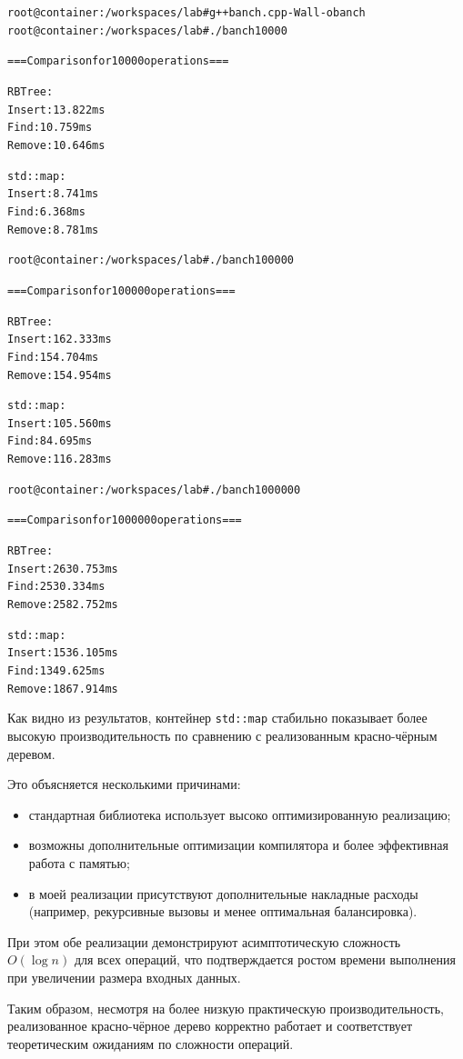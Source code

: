 \begin{alltt}
root@container:/workspaces/lab# g++ banch.cpp -Wall -o banch
root@container:/workspaces/lab# ./banch 10000

=== Comparison for 10000 operations ===

RBTree:
  Insert: 13.822 ms
  Find:   10.759 ms
  Remove: 10.646 ms

std::map:
  Insert: 8.741 ms
  Find:   6.368 ms
  Remove: 8.781 ms

root@container:/workspaces/lab# ./banch 100000

=== Comparison for 100000 operations ===

RBTree:
  Insert: 162.333 ms
  Find:   154.704 ms
  Remove: 154.954 ms

std::map:
  Insert: 105.560 ms
  Find:   84.695 ms
  Remove: 116.283 ms

root@container:/workspaces/lab# ./banch 1000000

=== Comparison for 1000000 operations ===

RBTree:
  Insert: 2630.753 ms
  Find:   2530.334 ms
  Remove: 2582.752 ms

std::map:
  Insert: 1536.105 ms
  Find:   1349.625 ms
  Remove: 1867.914 ms
\end{alltt}

Как видно из результатов, контейнер \texttt{std::map} стабильно показывает более высокую производительность по сравнению с реализованным красно-чёрным деревом.

Это объясняется несколькими причинами:
\begin{itemize}
    \item стандартная библиотека использует высоко оптимизированную реализацию;
    \item возможны дополнительные оптимизации компилятора и более эффективная работа с памятью;
    \item в моей реализации присутствуют дополнительные накладные расходы (например, рекурсивные вызовы и менее оптимальная балансировка).
\end{itemize}

При этом обе реализации демонстрируют асимптотическую сложность $O(\log n)$ для всех операций, что подтверждается ростом времени выполнения при увеличении размера входных данных.

Таким образом, несмотря на более низкую практическую производительность, реализованное красно-чёрное дерево корректно работает и соответствует теоретическим ожиданиям по сложности операций.

\pagebreak